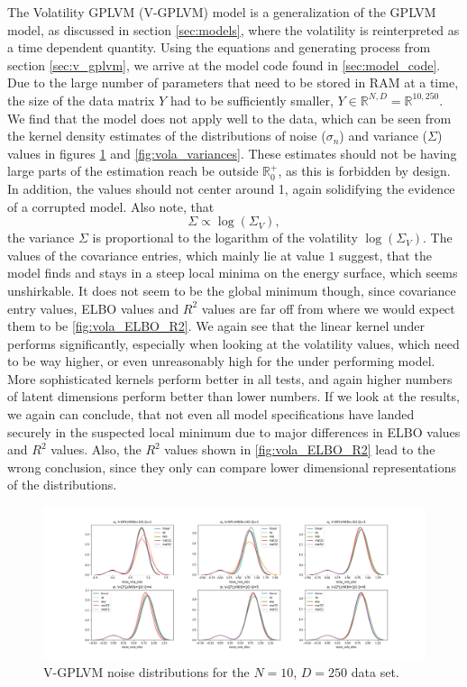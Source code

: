 The Volatility GPLVM (V-GPLVM) model is a generalization of the GPLVM model, as discussed in section \ref{sec:models}, where the volatility is reinterpreted as a time dependent quantity. Using the equations and generating process from section \ref{sec:v_gplvm}, we arrive at the model code found in \ref{sec:model_code}. Due to the large number of parameters that need to be stored in RAM at a time, the size of the data matrix $Y$ had to be sufficiently smaller, $Y\in\mathbb{R}^{N,D}=\mathbb{R}^{10,250}$. We find that the model does not apply well to the data, which can be seen from the kernel density estimates of the distributions of noise ($\sigma_n$) and variance ($\Sigma$) values in figures \ref{fig:vola_noises} and \ref{fig:vola_variances}. These estimates should not be having large parts of the estimation reach be outside $\mathbb{R}_0^+$, as this is forbidden by design. In addition, the values should not center around 1, again solidifying the evidence of a corrupted model. Also note, that 
\begin{equation}%
	\Sigma \propto \log(\Sigma_V),
	\label{eq:variance_volatility}
\end{equation}
the variance $\Sigma$ is proportional to the logarithm of the volatility $\log(\Sigma_V)$. The values of the covariance entries, which mainly lie at value $1$ suggest, that the model finds and stays in a steep local minima on the energy surface, which seems unshirkable. It does not seem to be the global minimum though, since covariance entry values, ELBO values and $R^2$ values are far off from where we would expect them to be \ref{fig:vola_ELBO_R2}. We again see that the linear kernel under performs significantly, especially when looking at the volatility values, which need to be way higher, or even unreasonably high for the under performing model. More sophisticated kernels perform better in all tests, and again higher numbers of latent dimensions perform better than lower numbers. If we look at the results, we again can conclude, that not even all model specifications have landed securely in the suspected local minimum due to major differences in ELBO values and $R^2$ values. Also, the $R^2$ values shown in \ref{fig:vola_ELBO_R2} lead to the wrong conclusion, since they only can compare lower dimensional representations of the distributions. 
\begin{figure}[t]%
	\centering
	\includegraphics[width=7in]{img/07_2/noise_VOLA_elbo.png}
	\caption[V-GPLVM noise distributions]{V-GPLVM noise distributions for the $N=10$, $D=250$ data set.}
	\label{fig:vola_noises}
\end{figure}
